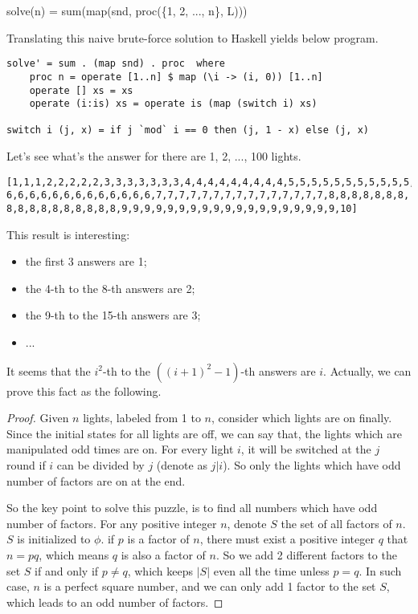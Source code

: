 \documentclass[b5paper]{article}
\begin{document}
\be
solve(n) = sum(map(snd, proc(\{1, 2, ..., n\}, L)))
\ee

Translating this naive brute-force solution to Haskell yields below program.

\lstset{language=Haskell}
\begin{lstlisting}
solve' = sum . (map snd) . proc  where
    proc n = operate [1..n] $ map (\i -> (i, 0)) [1..n]
    operate [] xs = xs
    operate (i:is) xs = operate is (map (switch i) xs)

switch i (j, x) = if j `mod` i == 0 then (j, 1 - x) else (j, x)
\end{lstlisting} %

Let's see what's the answer for there are 1, 2, ..., 100 lights.

\begin{verbatim}
[1,1,1,2,2,2,2,2,3,3,3,3,3,3,3,4,4,4,4,4,4,4,4,4,5,5,5,5,5,5,5,5,5,5,5,
6,6,6,6,6,6,6,6,6,6,6,6,6,7,7,7,7,7,7,7,7,7,7,7,7,7,7,7,8,8,8,8,8,8,8,
8,8,8,8,8,8,8,8,8,8,9,9,9,9,9,9,9,9,9,9,9,9,9,9,9,9,9,9,9,10]
\end{verbatim}

This result is interesting:

\begin{itemize}
\item the first 3 answers are 1;
\item the 4-th to the 8-th answers are 2;
\item the 9-th to the 15-th answers are 3;
\item ...
\end{itemize}

It seems that the $i^2$-th to the $((i+1)^2-1)$-th answers are $i$. Actually, we can prove this fact as the following.

\begin{proof}
Given $n$ lights, labeled from 1 to $n$, consider which lights are on finally. Since the initial states for all lights
are off, we can say that, the lights which are manipulated odd times are on. For every light $i$, it will be switched
at the $j$ round if $i$ can be divided by $j$ (denote as $j | i$). So only the lights which have odd number of factors are on at the end.

So the key point to solve this puzzle, is to find all numbers which have odd number of factors. For any positive integer
$n$, denote $S$ the set of all factors of $n$. $S$ is initialized to $\phi$. if $p$ is a factor of $n$, there must
exist a positive integer $q$ that $n = p q$, which means $q$ is also a factor of $n$. So we add 2 different factors to
the set $S$ if and only if $p \neq q$, which keeps $|S|$ even all the time unless $p = q$. In such case, $n$ is a
perfect square number, and we can only add 1 factor to the set $S$, which leads to an odd number of factors.
\end{proof}
\end{document}
